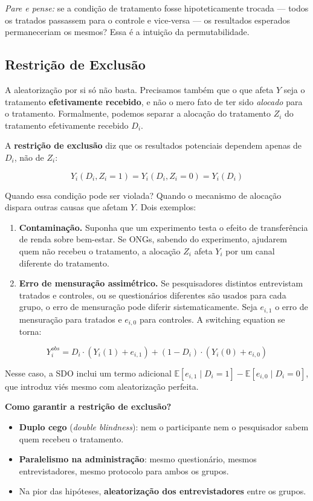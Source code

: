 \documentclass[
]{article}
\providecommand{\tightlist}{%
  \setlength{\itemsep}{0pt}\setlength{\parskip}{0pt}}
\begin{document}
\emph{Pare e pense:} se a condição de tratamento fosse hipoteticamente trocada --- todos os tratados passassem para o controle e vice-versa --- os resultados esperados permaneceriam os mesmos? Essa é a intuição da permutabilidade.

\subsection{Restrição de Exclusão}\label{restriuxe7uxe3o-de-exclusuxe3o}

A aleatorização por si só não basta. Precisamos também que o que afeta \(Y\) seja o tratamento \textbf{efetivamente recebido}, e não o mero fato de ter sido \emph{alocado} para o tratamento. Formalmente, podemos separar a alocação do tratamento \(Z_i\) do tratamento efetivamente recebido \(D_i\).

A \textbf{restrição de exclusão} diz que os resultados potenciais dependem apenas de \(D_i\), não de \(Z_i\):

\[Y_i(D_i, Z_i = 1) = Y_i(D_i, Z_i = 0) = Y_i(D_i)\]

Quando essa condição pode ser violada? Quando o mecanismo de alocação dispara outras causas que afetam \(Y\). Dois exemplos:

\begin{enumerate}
\def\labelenumi{\arabic{enumi}.}
\item
  \textbf{Contaminação.} Suponha que um experimento testa o efeito de transferência de renda sobre bem-estar. Se ONGs, sabendo do experimento, ajudarem quem não recebeu o tratamento, a alocação \(Z_i\) afeta \(Y_i\) por um canal diferente do tratamento.
\item
  \textbf{Erro de mensuração assimétrico.} Se pesquisadores distintos entrevistam tratados e controles, ou se questionários diferentes são usados para cada grupo, o erro de mensuração pode diferir sistematicamente. Seja \(e_{i,1}\) o erro de mensuração para tratados e \(e_{i,0}\) para controles. A switching equation se torna:
\end{enumerate}

\[Y_i^{obs} = D_i \cdot (Y_i(1) + e_{i,1}) + (1 - D_i) \cdot (Y_i(0) + e_{i,0})\]

Nesse caso, a SDO inclui um termo adicional \(\mathbb{E}[e_{i,1} \mid D_i=1] - \mathbb{E}[e_{i,0} \mid D_i=0]\), que introduz viés mesmo com aleatorização perfeita.

\textbf{Como garantir a restrição de exclusão?}

\begin{itemize}
\tightlist
\item
  \textbf{Duplo cego} (\emph{double blindness}): nem o participante nem o pesquisador sabem quem recebeu o tratamento.
\item
  \textbf{Paralelismo na administração}: mesmo questionário, mesmos entrevistadores, mesmo protocolo para ambos os grupos.
\item
  Na pior das hipóteses, \textbf{aleatorização dos entrevistadores} entre os grupos.
\end{itemize}
\end{document}

